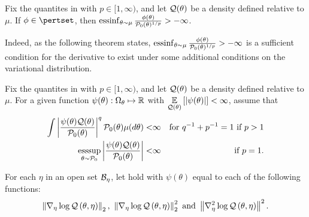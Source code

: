 \begin{lem}
%
Fix the quantites in  with $p \in [1, \infty)$, and let
$\mathcal{Q}(\theta)$ be a density defined relative to $\mu$.  If $\phi \in \pertset$,
then $\operatorname*{\mathrm{essinf}}_{\theta \sim \mu}\frac{\phi(\theta)}{\mathcal{P}_{0}(\theta)^{1/p}} >
-\infty$.
%
\end{lem}

Indeed, as the following theorem states, $\operatorname*{\mathrm{essinf}}_{\theta \sim
\mu}\frac{\phi(\theta)}{\mathcal{P}_{0}(\theta)^{1/p}} > -\infty$ is a sufficient
condition for the derivative to exist under some additional conditions on the
variational distribution.

\begin{assu}
%
Fix the quantites in  with $p \in [1, \infty)$, and let
$\mathcal{Q}(\theta)$ be a density defined relative to $\mu$.  For a given function
$\psi(\theta): \Omega_{\theta} \mapsto \mathbb{R}$ with
$\underset{\mathcal{Q}(\theta)}{\mathbb{E}}\left[\left|\psi(\theta)\right|\right] < \infty$, assume that
%
\begin{align*}
%
\int \abs{\frac{\psi(\theta) \q(\theta)}{\pbase(\theta)}}^q
\pbase(\theta) \mu(d\theta) <& \infty
    & \textrm{for }q^{-1} + p^{-1} = 1\textrm{ if }p > 1 \\
\esssup_{\theta \sim \pbase} \abs{\frac{\psi(\theta) \q(\theta)}{\pbase(\theta)}}
 <& \infty
    & \textrm{ if }p = 1.
%
\end{align*}
%
%
\end{assu}


\begin{assu}
%
For each $\eta$ in an open set $\mathcal{B}_\eta$, let  hold with
$\psi(\theta)$ equal to each of the following functions:
%
\begin{align*}
%
 \norm{\lqgrad{\theta, \eta}}_2 \textrm{, }
 \norm{\lqgrad{\theta, \eta}}^2_2 \textrm{ and }
 \norm{\lqhess{\theta, \eta}}^2.
%
\end{align*}
%
\end{assu}


